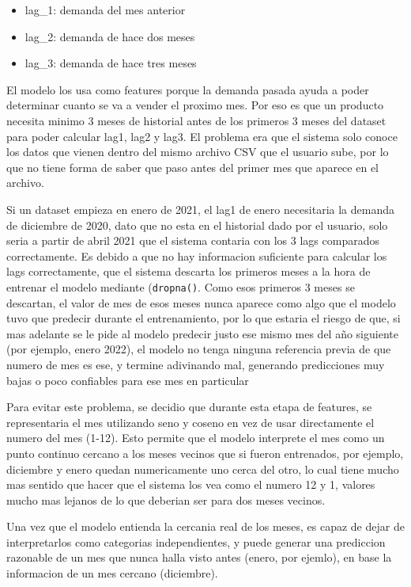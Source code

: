 \begin{itemize}
    \item lag\_1: demanda del mes anterior
    \item lag\_2: demanda de hace dos meses
    \item lag\_3: demanda de hace tres meses
\end{itemize}

El modelo los usa como features porque la demanda pasada ayuda a poder determinar cuanto se va a vender el proximo mes. Por eso es que un producto necesita minimo 3 meses de historial antes de los primeros 3 meses del dataset para poder calcular lag1, lag2 y lag3. El problema era que el sistema solo conoce los datos que vienen dentro del mismo archivo CSV que el usuario sube, por lo que no tiene forma de saber que paso antes del primer mes que aparece en el archivo.

Si un dataset empieza en enero de 2021, el lag1 de enero necesitaria la demanda de diciembre de 2020, dato que no esta en el historial dado por el usuario, solo seria a partir de abril 2021 que el sistema contaria con los 3 lags comparados correctamente. Es debido a que no hay informacion suficiente para calcular los lags correctamente, que el sistema descarta los primeros meses a la hora de entrenar el modelo mediante (\texttt{dropna()}. Como esos primeros 3 meses se descartan,  el valor de mes de esos meses nunca aparece como algo que el modelo tuvo que predecir durante el entrenamiento, por lo que estaria el riesgo de que, si mas adelante se le pide al modelo predecir justo ese mismo mes del año siguiente (por ejemplo, enero 2022), el modelo no tenga ninguna referencia previa de que numero de mes es ese, y termine adivinando mal, generando predicciones muy bajas o poco confiables para ese mes en particular

Para evitar este problema, se decidio que durante esta etapa de features, se representaria el mes utilizando seno y coseno en vez de usar directamente el numero del mes (1-12). Esto permite que el modelo interprete el mes como un punto continuo cercano a los meses vecinos que si fueron entrenados, por ejemplo, diciembre y enero quedan numericamente uno cerca del otro, lo cual tiene mucho mas sentido que hacer que el sistema los vea como el numero 12 y 1, valores mucho mas lejanos de lo que deberian ser para dos meses vecinos. 

Una vez que el modelo entienda la cercania real de los meses, es capaz de dejar de interpretarlos como categorias independientes, y puede generar una prediccion razonable de un mes que nunca halla visto antes (enero, por ejemlo), en base la informacion de un mes cercano (diciembre).

